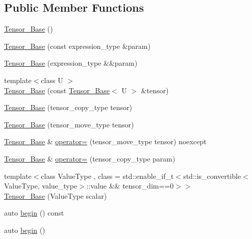 \subsection*{Public Member Functions}
\begin{DoxyCompactItemize}
\item 
\hyperlink{classbc_1_1tensors_1_1Tensor__Base_a9074ece5d8b8eb8206facadf8e5c1e70}{Tensor\+\_\+\+Base} ()
\item 
\hyperlink{classbc_1_1tensors_1_1Tensor__Base_aabe1d25d808d5f66eb6b65a73284395b}{Tensor\+\_\+\+Base} (const expression\+\_\+type \&param)
\item 
\hyperlink{classbc_1_1tensors_1_1Tensor__Base_aa410bdc31819c314f2beadc70512e914}{Tensor\+\_\+\+Base} (expression\+\_\+type \&\&param)
\item 
{\footnotesize template$<$class U $>$ }\\\hyperlink{classbc_1_1tensors_1_1Tensor__Base_a58644f3efe86d99dea9b7f4a8645f3b6}{Tensor\+\_\+\+Base} (const \hyperlink{classbc_1_1tensors_1_1Tensor__Base}{Tensor\+\_\+\+Base}$<$ U $>$ \&tensor)
\item 
\hyperlink{classbc_1_1tensors_1_1Tensor__Base_ab18c4eed615bfa6baa87c524c55a28ee}{Tensor\+\_\+\+Base} (tensor\+\_\+copy\+\_\+type tensor)
\item 
\hyperlink{classbc_1_1tensors_1_1Tensor__Base_adc5d06f38b6ac0566735719a3531dfc9}{Tensor\+\_\+\+Base} (tensor\+\_\+move\+\_\+type tensor)
\item 
\hyperlink{classbc_1_1tensors_1_1Tensor__Base}{Tensor\+\_\+\+Base} \& \hyperlink{classbc_1_1tensors_1_1Tensor__Base_a63495fc3dadef768af28ba59e949cba3}{operator=} (tensor\+\_\+move\+\_\+type tensor) noexcept
\item 
\hyperlink{classbc_1_1tensors_1_1Tensor__Base}{Tensor\+\_\+\+Base} \& \hyperlink{classbc_1_1tensors_1_1Tensor__Base_a702f38f7ad53a727ef2a20ae30ca0ba0}{operator=} (tensor\+\_\+copy\+\_\+type param)
\item 
{\footnotesize template$<$class Value\+Type , class  = std\+::enable\+\_\+if\+\_\+t$<$std\+::is\+\_\+convertible$<$\+Value\+Type, value\+\_\+type$>$\+::value \&\& tensor\+\_\+dim==0$>$$>$ }\\\hyperlink{classbc_1_1tensors_1_1Tensor__Base_a84dd106fa62c225311f8454aa80ffb94}{Tensor\+\_\+\+Base} (Value\+Type scalar)
\item 
auto \hyperlink{classbc_1_1tensors_1_1Tensor__Base_a180c98868c31934da3caa17e560fe941}{begin} () const
\item 
auto \hyperlink{classbc_1_1tensors_1_1Tensor__Base_ac1cde08ed6a10c4f714cceb63c95b5e2}{begin} ()

\end{DoxyCompactItemize}
